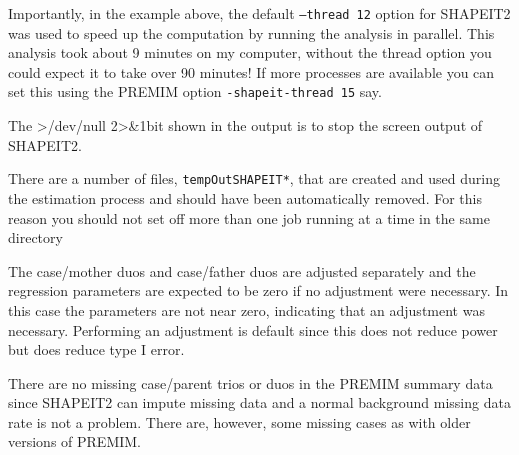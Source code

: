 \documentclass[a4paper,12pt]{article}
\newcommand{\code}[1]{{\footnotesize{{\tt #1}}}}
\begin{document}
Importantly, in the example above, the default \code{--thread 12} option for SHAPEIT2 was used to speed up the computation by running the analysis in parallel. This analysis took about 9 minutes on my computer, without the thread option you could expect it to take over 90 minutes! If more processes are available you can set this using the PREMIM option \code{-shapeit-thread 15} say. 

The >/dev/null 2>\&1bit shown in the output is to stop the screen output of SHAPEIT2. 

There are a number of files, \code{tempOutSHAPEIT*}, that are created and used during the estimation process and should have been automatically removed. For this reason you should not set off more than one job running at a time in the same directory 

The case/mother duos and case/father duos are adjusted separately and the regression parameters are expected to be zero if no adjustment were necessary. In this case the parameters are not near zero, indicating that an adjustment was necessary. Performing an adjustment is default since this does not reduce power but does reduce type I error. 

There are no missing case/parent trios or duos in the PREMIM summary data since SHAPEIT2 can impute missing data and a normal background missing data rate is not a problem. There are, however, some missing cases as with older versions of PREMIM. 
\end{document}
